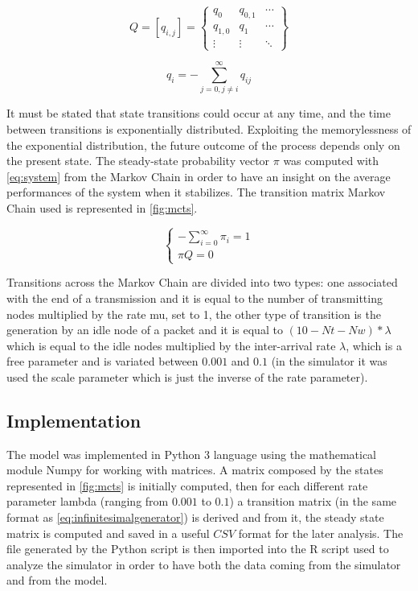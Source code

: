 \documentclass[conference]{IEEEtran}
\begin{document}
\begin{equation}
    Q=[q_{i,j}]=\begin{Bmatrix} q_{0} & q_{0,1} & \cdots \\ q_{1,0} & q_{1} & \cdots \\ \vdots & \vdots & \ddots \end{Bmatrix}\label{eq:infinitesimalgenerator}
\end{equation}

\begin{equation}
    q_i=-\sum_{j=0,j\neq i}^{\infty}q_{ij}\label{eq:qi}
\end{equation}

It must be stated that state transitions could occur at any time, and the time between transitions is exponentially distributed. Exploiting the memorylessness of the exponential distribution, the future outcome of the process depends only on the present state. The steady-state probability vector \(\pi\) was computed with \cref{eq:system} from the Markov Chain in order to have an insight on the average performances of the system when it stabilizes. The transition matrix Markov Chain used is represented in \cref{fig:mcts}.

\begin{equation}
    \left\{\begin{matrix} -\sum_{i=0}^{\infty}\pi_i=1 \\ \pi Q=0 \end{matrix}\right.\label{eq:system}
\end{equation}

Transitions across the Markov Chain are divided into two types: one associated with the end of a transmission and it is equal to the number of transmitting nodes multiplied by the rate mu, set to 1, the other type of transition is the generation by an idle node of a packet and it is equal to $ (10 - Nt - Nw)*\lambda $ which is equal to the idle nodes multiplied by the inter-arrival rate $ \lambda $, which is a free parameter and is variated between \(0.001\) and  \(0.1\) (in the simulator it was used the scale parameter which is just the inverse of the rate parameter).

\subsection{Implementation}\label{sec:implementationmodel}
The model was implemented in Python 3 language using the mathematical module Numpy for working with matrices. A matrix composed by the states represented in \cref{fig:mcts} is initially computed, then for each different rate parameter lambda (ranging from \(0.001\) to \(0.1\)) a transition matrix (in the same format as \cref{eq:infinitesimalgenerator}) is derived and from it, the steady state matrix is computed and saved in a useful \(CSV\) format for the later analysis. The file generated by the Python script is then imported into the R script used to analyze the simulator in order to have both the data coming from the simulator and from the model.
\end{document}
